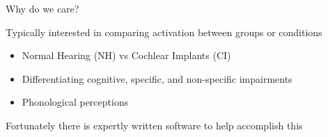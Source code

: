 \documentclass{beamer}
\begin{document}
\begin{frame}{Why do we care?}

Typically interested in comparing activation between groups or conditions \vspace{2mm}

\begin{itemize}
\item Normal Hearing (NH) vs Cochlear Implants (CI) \vspace{2mm}
\item Differentiating cognitive, specific, and non-specific impairments \vspace{2mm}
\item Phonological perceptions \vspace{2mm}
\end{itemize}

Fortunately there is expertly written software to help accomplish this

\end{frame}
\end{document}
